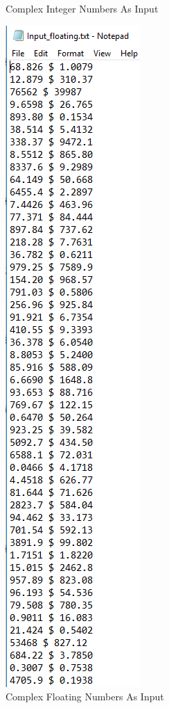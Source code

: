 \documentclass[12pt, titlepage]{article}
\begin{document}
\begin{figure}[h!]
\begin{minipage}[b]{0.38\textwidth}
\caption{Complex Integer Numbers As Input}
\label{Fig_Inputcomplex} 
\end{minipage}
\hfill
\begin{minipage}[b]{0.31\textwidth}
 \includegraphics[width=\textwidth]{Input_floating}
\caption{Complex Floating Numbers As Input}
\label{Fig_Inputfloating} 
\end{minipage}
\end{figure}
\end{document}
